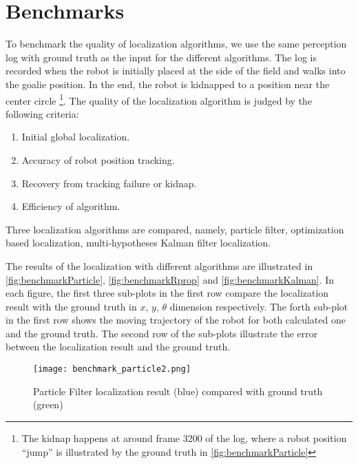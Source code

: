 




\section{Benchmarks}
\label{sec:Benchmark}
To benchmark the quality of localization algorithms, we use the same perception log with ground truth as the input for the different algorithms. The log is recorded when the robot is initially placed at the side of the field and walks into the goalie position. In the end, the robot is kidnapped to a position near the center circle \footnote{The kidnap happens at around frame 3200 of the log, where a robot position ``jump'' is illustrated by the ground truth in \autoref{fig:benchmarkParticle}}. The quality of the localization algorithm is judged by the following criteria: 
\begin{enumerate}
  \item Initial global localization.
  \item Accuracy of robot position tracking.
  \item Recovery from tracking failure or kidnap.
  \item Efficiency of algorithm.
\end{enumerate}

Three localization algorithms are compared, namely, particle filter, optimization based localization, multi-hypotheses Kalman filter localization.

The results of the localization with different algorithms are illustrated in 
\autoref{fig:benchmarkParticle}, \autoref{fig:benchmarkRprop} and \autoref{fig:benchmarkKalman}. In each figure, the first three sub-plots in the first row compare the localization result with the ground truth in $x$, $y$, $\theta$ dimension respectively. The forth sub-plot in the first row shows the moving trajectory of the robot for both calculated one and the ground truth. The second row of the sub-plots illustrate the error between the localization result and the ground truth.

\begin{figure}[h!]
\begin{center}
	\texttt{[image: benchmark\_particle2.png]}
\end{center}
\caption{Particle Filter localization result (blue) compared with ground truth (green)}
\label{fig:benchmarkParticle}
\end{figure}

